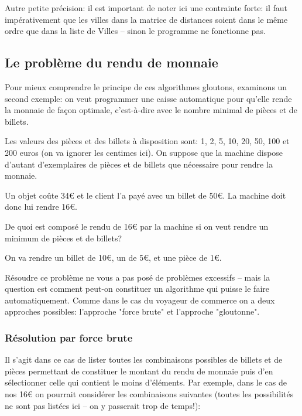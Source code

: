 \documentclass[12pt]{article}
\begin{document}
\begin{MaReponse}
		Autre petite précision: il est important de noter ici une contrainte forte: il faut impérativement que les villes dans la matrice de distances soient dans le même ordre que dans la liste de Villes -- sinon le programme ne fonctionne pas.
		
	\end{MaReponse}
	
	\subsection{Le problème du rendu de monnaie}
	Pour mieux comprendre le principe de ces algorithmes gloutons, examinons un second exemple: on veut programmer une caisse automatique pour qu'elle rende la monnaie de façon optimale, c'est-à-dire avec le nombre minimal de pièces et de billets.
	
	Les valeurs des pièces et des billets à disposition sont: 1, 2, 5, 10, 20, 50, 100 et 200 euros (on va ignorer les centimes ici). On suppose que la machine dispose d'autant d'exemplaires de pièces et de billets que nécessaire pour rendre la monnaie.
	
	\begin{MonExo}
		Un objet coûte 34\euro{} et le client l'a payé avec un billet de 50\euro{}. La machine doit donc lui rendre 16\euro{}.
		
		De quoi est composé le rendu de 16\euro{} par la machine si on veut rendre un minimum de pièces et de billets?
	\end{MonExo}
	\begin{MaReponse}
		On va rendre un billet de 10\euro{}, un de 5\euro{}, et une pièce de 1\euro{}.
	\end{MaReponse}
	
	Résoudre ce problème ne vous a pas posé de problèmes excessifs -- mais la question est comment peut-on constituer un algorithme qui puisse le faire automatiquement. Comme dans le cas du voyageur de commerce on a deux approches possibles: l'approche "force brute" et l'approche "gloutonne".
	
	\subsubsection*{Résolution par force brute}
	Il s'agit dans ce cas de lister toutes les combinaisons possibles de billets et de pièces permettant de constituer le montant du rendu de monnaie puis d'en sélectionner celle qui contient le moins d'éléments. Par exemple, dans le cas de nos 16\euro{} on pourrait considérer les combinaisons suivantes (toutes les possibilités ne sont pas listées ici -- on y passerait trop de temps!):
	
\end{document}
